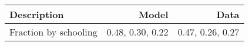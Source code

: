 \begin{tabular}{lrr}
\hline
Description & Model  & Data  \\ 
\hline
Fraction by schooling & 0.48, 0.30, 0.22  & 0.47, 0.26, 0.27  \\ 
\hline
\end{tabular}%
